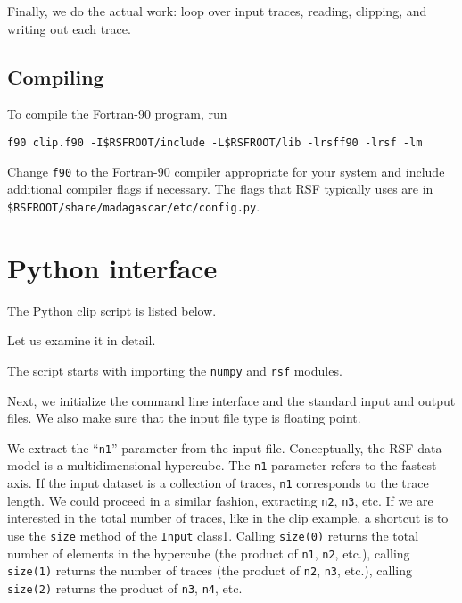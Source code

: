 
Finally, we do the actual work: loop over input traces, reading,
clipping, and writing out each trace.

\subsection{Compiling}
To compile the Fortran-90 program, run
\begin{verbatim}
f90 clip.f90 -I$RSFROOT/include -L$RSFROOT/lib -lrsff90 -lrsf -lm
\end{verbatim}
Change \texttt{f90} to the Fortran-90 compiler appropriate for your system and
include additional compiler flags if necessary. The flags that RSF typically
uses are in \\ \texttt{\$RSFROOT/share/madagascar/etc/config.py}.

\section{Python interface}

\lstset{language=python}
\renewcommand{\rsfclip}{\RSF/api/python/test/clip.py}

The Python clip script is listed below.


Let us examine it in detail. 


The script starts with importing the \texttt{numpy} and \texttt{rsf}
modules.


Next, we initialize the command line interface and the standard input and
output files. We also make sure that the input file type is floating point.


We extract the ``\texttt{n1}'' parameter from the input file.
Conceptually, the RSF data model is a multidimensional hypercube.  The
\texttt{n1} parameter refers to the fastest axis. If the input dataset
is a collection of traces, \texttt{n1} corresponds to the trace
length. We could proceed in a similar fashion, extracting \texttt{n2},
\texttt{n3}, etc. If we are interested in the total number of traces,
like in the clip example, a shortcut is to use the \texttt{size}
method of the \texttt{Input} class1.  Calling \texttt{size(0)} returns
the total number of elements in the hypercube (the product of
\texttt{n1}, \texttt{n2}, etc.), calling \texttt{size(1)} returns the
number of traces (the product of \texttt{n2}, \texttt{n3}, etc.),
calling \texttt{size(2)} returns the product of \texttt{n3},
\texttt{n4}, etc.

